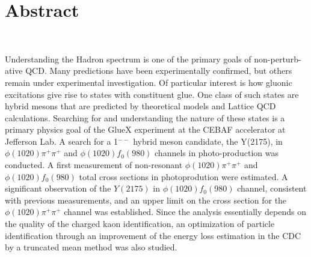 \section*{Abstract} %

~\par Understanding the Hadron spectrum is one of the primary goals of non-perturb-ative QCD. Many predictions have been experimentally confirmed, but others remain under experimental investigation. Of particular interest is how gluonic excitations give rise to states with constituent glue. One class of such states are hybrid mesons that are predicted by theoretical models and Lattice QCD calculations. Searching for and understanding the nature of these states is a primary physics goal of the GlueX experiment at the CEBAF accelerator at Jefferson Lab. A search for a 1$^{--}$ hybrid meson candidate, the Y(2175), in $\phi(1020)\pi^{+}\pi^{+}$ and $\phi(1020)f_{0}(980)$ channels in photo-production was conducted. A first measurement of non-resonant $\phi(1020)\pi^{+}\pi^{+}$ and $\phi(1020)f_{0}(980)$ total cross sections in photoprodution were estimated. A significant observation of the $Y(2175)$ in $\phi(1020)f_{0}(980)$ channel, consistent with previous measurements, and an upper limit on the cross section for the $\phi(1020)\pi^{+}\pi^{+}$ channel was established. Since the analysis essentially depends on the quality of the charged kaon identification, an optimization of particle identification through an improvement of the energy loss estimation in the CDC by a truncated mean method was also studied.